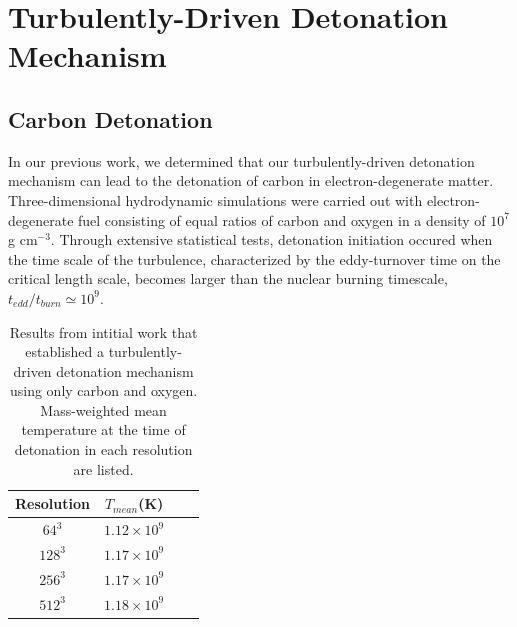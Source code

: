 \chapter{Turbulently-Driven Detonation Mechanism}

\section{Carbon Detonation}

In our previous work, we determined that our turbulently-driven detonation mechanism can lead to the detonation of carbon in electron-degenerate matter. Three-dimensional hydrodynamic simulations were carried out with electron-degenerate fuel consisting of equal ratios of carbon and oxygen in a density of $10^7$ g cm$^{-3}$. Through extensive statistical tests, detonation initiation occured when the time scale of the turbulence, characterized by the eddy-turnover time on the critical length scale, becomes larger than the nuclear burning timescale, $t_{edd}/t_{burn} \simeq 10^9$.

\begin{table}[htp]
\caption[A table of carbon-oxygen runs with different resolution, RMS velocity and mean temperature..]{Results from intitial work that established a turbulently-driven detonation mechanism using only carbon and oxygen. Mass-weighted mean temperature at the time of detonation in each resolution are listed.}
  \begin{center}
      \begin{tabular}{|c|c|c|c|}
        \hline
	      Resolution & $T_{mean}$(K) \\
        \hline\hline
        $64^3$   & $1.12 \times 10^9$ \\
	$128^3$   & $1.17 \times 10^9$ \\
	$256^3$   & $1.17 \times 10^9$ \\
	$512^3$   & $1.18 \times 10^9$ \\      
        \hline
   \end{tabular}
  \end{center}
  \label{runs}
\end{table}

